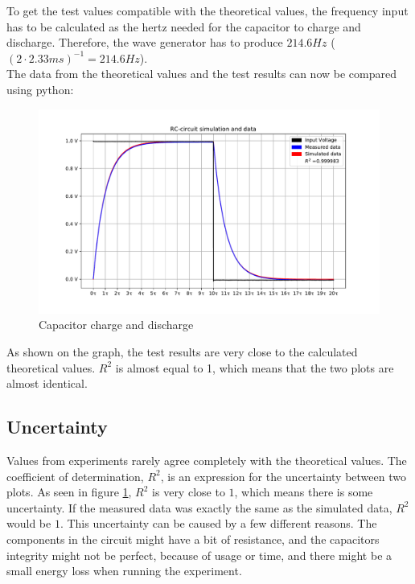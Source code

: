 To get the test values compatible with the theoretical values, the frequency input has to be calculated as the hertz needed for the capacitor to charge and discharge. Therefore, the wave generator has to produce $214.6 Hz$  ($(2 \cdot 2.33 ms)^{-1} = 214.6 Hz$). \\
The data from the theoretical values and the test results can now be compared using python:
\begin{figure}[H]
\center
\includegraphics[scale=0.6]{fig/img/eks_1}
\caption{Capacitor charge and discharge}
\label{fig:Cap}
\end{figure}
\noindent As shown on the graph, the test results are very close to the calculated theoretical values. $R^2$ is almost equal to 1, which means that the two plots are almost identical.

\subsection{Uncertainty}
Values from experiments rarely agree completely with the theoretical values. The coefficient of determination, $R^2$, is an expression for the uncertainty between two plots. As seen in figure \ref{fig:Cap}, $R^2$ is very close to $1$, which means there is some uncertainty. If the measured data was exactly the same as the simulated data, $R^2$ would be $1$. This uncertainty can be caused by a few different reasons. The components in the circuit might have a bit of resistance, and the capacitors integrity might not be perfect, because of usage or time, and there might be a small energy loss when running the experiment. 